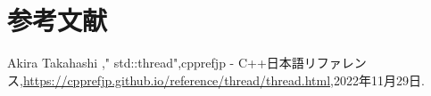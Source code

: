 \documentclass[a4paper,dvipdfmx]{jsarticle}
\begin{document}
\section{参考文献}
\begin{thebibliography}{99}
    \item Akira Takahashi ," std::thread",cpprefjp - C++日本語リファレンス,\url{https://cpprefjp.github.io/reference/thread/thread.html},2022年11月29日.

\end{thebibliography}
\end{document}
